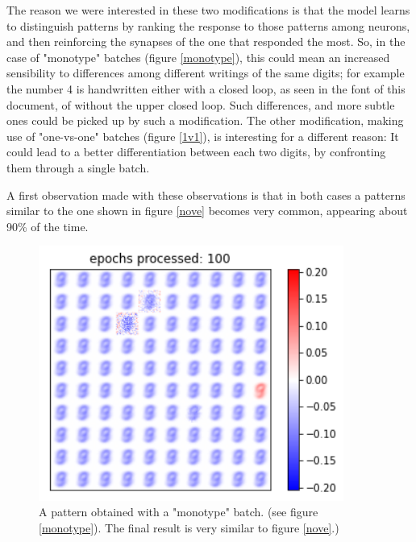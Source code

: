 \documentclass[a4paper]{report}
\begin{document}
The reason we were interested in these two modifications is that the model learns to distinguish patterns by ranking the response to those patterns among neurons, and then reinforcing the synapses of the one that responded the most.
So, in the case of "monotype" batches (figure \ref{monotype}), this could mean an increased sensibility to differences among different writings of the same digits;
for example the number 4 is handwritten either with a closed loop, as seen in the font of this document, of without the upper closed loop.
Such differences, and more subtle ones could be picked up by such a modification.
The other modification, making use of "one-vs-one" batches (figure \ref{1v1}), is interesting for a different reason:
It could lead to a better differentiation between each two digits, by confronting them through a single batch.

A first observation made with these observations is that in both cases a patterns similar to the one shown in figure \ref{nove} becomes very common, appearing about 90\% of the time.

\begin{figure} [H]
	\centering
	\includegraphics [width=10cm] {h/nove_mono.png}
	\caption{A pattern obtained with a "monotype" batch. (see figure \ref{monotype}). The final result is very similar to figure \ref{nove}.)}
\end{figure}
\end{document}
